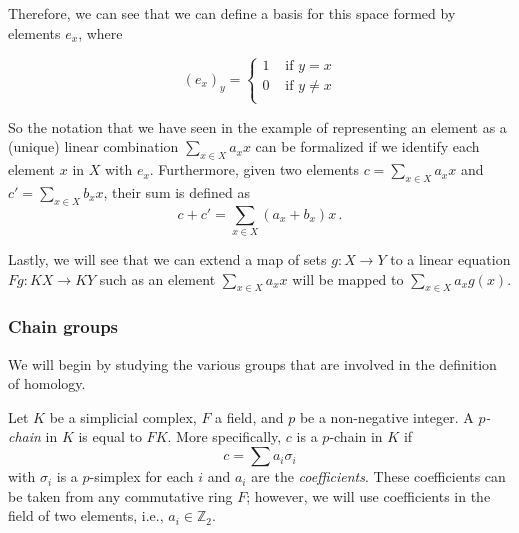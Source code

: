 \documentclass[../main.tex]{subfiles}
\begin{document}
Therefore, we can see that we can define a basis for this space formed by elements $e_x$, where

\[
(e_x)_y = \left\{\begin{matrix}
1 & \text{ if } y=x\\
0 & \text{ if } y \neq x\\
\end{matrix}\right.
\]

So the notation that we have seen in the example of representing an element as a (unique) linear combination $\sum_{x \in X} a_x x$ can be formalized if we identify each element $x$ in $X$ with $e_x$. Furthermore, given two elements $c = \sum_{x \in X} a_x x$ and $c' = \sum_{x \in X} b_x x$, their sum is defined as
\[
c + c' = \sum_{x \in X} (a_x + b_x) x\,.
\]

Lastly, we will see that we can extend a map of sets $g:X \to Y$ to a linear equation $Fg: KX \to KY$ such as an element $\sum_{x \in X} a_x x$ will be mapped to $\sum_{x \in X} a_x g(x)$.


\subsubsection*{Chain groups}
We will begin by studying the various groups that are involved in the definition of homology.


Let $K$ be a simplicial complex, $F$ a field, and $p$ be a non-negative integer. A \emph{$p$-chain} in $K$ is equal to $FK$. More specifically, $c$ is a $p$-chain in $K$ if
\[
c = \sum a_i\sigma_i
\]
with $\sigma_i$ is a $p$-simplex for each $i$ and $a_i$ are the \emph{coefficients}. These coefficients can be taken from any commutative ring $F$; however, we will use coefficients in the field of two elements, i.e.,  $a_i \in \mathbb{Z}_2$.
\end{document}
